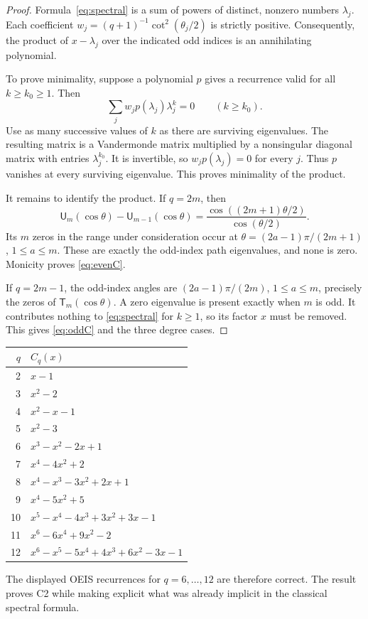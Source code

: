\documentclass[11pt,letterpaper]{article}
\numberwithin{equation}{section}
\theoremstyle{definition}
\begin{document}
\begin{proof}
Formula~\eqref{eq:spectral} is a sum of powers of distinct, nonzero
numbers $\lambda_j$.  Each coefficient
$w_j=(q+1)^{-1}\cot^2(\theta_j/2)$ is strictly positive.  Consequently,
the product of $x-\lambda_j$ over the indicated odd indices is an
annihilating polynomial.

To prove minimality, suppose a polynomial $p$ gives a recurrence
valid for all $k\ge k_0\ge1$.  Then
\[
\sum_j w_jp(\lambda_j)\lambda_j^k=0\qquad(k\ge k_0).
\]
Use as many successive values of $k$ as there are surviving eigenvalues.
The resulting matrix is a Vandermonde matrix multiplied by a nonsingular
diagonal matrix with entries $\lambda_j^{k_0}$.  It is invertible, so
$w_jp(\lambda_j)=0$ for every $j$.  Thus $p$ vanishes at every surviving
eigenvalue.  This proves minimality of the product.

It remains to identify the product.  If $q=2m$, then
\[
\mathsf U_m(\cos\theta)-\mathsf U_{m-1}(\cos\theta)
=\frac{\cos((2m+1)\theta/2)}{\cos(\theta/2)}.
\]
Its $m$ zeros in the range under consideration occur at
$\theta=(2a-1)\pi/(2m+1)$, $1\le a\le m$.  These are exactly the odd-index
path eigenvalues, and none is zero.  Monicity proves \eqref{eq:evenC}.

If $q=2m-1$, the odd-index angles are
$(2a-1)\pi/(2m)$, $1\le a\le m$, precisely the zeros of
$\mathsf T_m(\cos\theta)$.  A zero eigenvalue is present exactly when $m$
is odd.  It contributes nothing to \eqref{eq:spectral} for $k\ge1$, so its
factor $x$ must be removed.  This gives \eqref{eq:oddC} and the three
degree cases.
\end{proof}

\begin{center}
\begin{tabular}{r l}
\toprule
$q$ & $C_q(x)$ \\
\midrule
2 & $x-1$ \\
3 & $x^2-2$ \\
4 & $x^2-x-1$ \\
5 & $x^2-3$ \\
6 & $x^3-x^2-2x+1$ \\
7 & $x^4-4x^2+2$ \\
8 & $x^4-x^3-3x^2+2x+1$ \\
9 & $x^4-5x^2+5$ \\
10 & $x^5-x^4-4x^3+3x^2+3x-1$ \\
11 & $x^6-6x^4+9x^2-2$ \\
12 & $x^6-x^5-5x^4+4x^3+6x^2-3x-1$ \\
\bottomrule
\end{tabular}
\end{center}
The displayed OEIS recurrences for $q=6,\ldots,12$ are therefore correct.
The result proves C2 while making explicit what was already implicit
in the classical spectral formula.
\end{document}
